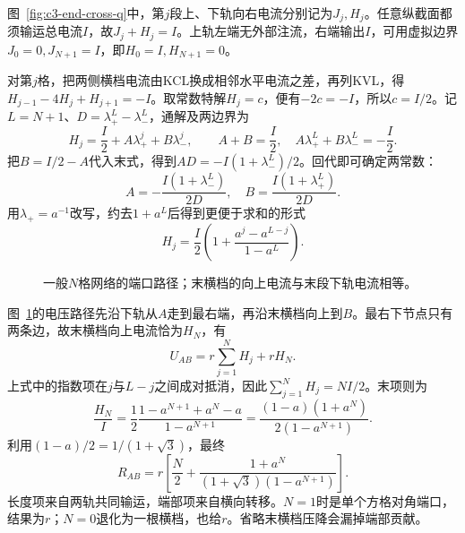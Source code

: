 \begin{solution}
图~\ref{fig:c3-end-cross-q}中，第$j$段上、下轨向右电流分别记为$J_j,H_j$。任意纵截面都须输运总电流$I$，故$J_j+H_j=I$。上轨左端无外部注流，右端输出$I$，可用虚拟边界$J_0=0,J_{N+1}=I$，即$H_0=I,H_{N+1}=0$。

对第$j$格，把两侧横档电流由KCL换成相邻水平电流之差，再列KVL，得$H_{j-1}-4H_j+H_{j+1}=-I$。取常数特解$H_j=c$，便有$-2c=-I$，所以$c=I/2$。记$L=N+1$、$D=\lambda_+^L-\lambda_-^L$，通解及两边界为
\[
 H_j=\frac I2+A\lambda_+^j+B\lambda_-^j,\qquad
 A+B=\frac I2,\quad A\lambda_+^L+B\lambda_-^L=-\frac I2.
\]
把$B=I/2-A$代入末式，得到$AD=-I(1+\lambda_-^L)/2$。回代即可确定两常数：
\[
 A=-\frac{I(1+\lambda_-^L)}{2D},\quad
 B=\frac{I(1+\lambda_+^L)}{2D}.
\]
用$\lambda_+=a^{-1}$改写，约去$1+a^L$后得到更便于求和的形式
\[
 \boxed{H_j=\frac I2\left(1+\frac{a^j-a^{L-j}}{1-a^L}\right)}.
\]
\begin{figure}[H]\centering
{}
\caption{一般$N$格网络的端口路径；末横档的向上电流与末段下轨电流相等。}\label{fig:c3-end-cross-s}
\end{figure}
图~\ref{fig:c3-end-cross-s}的电压路径先沿下轨从$A$走到最右端，再沿末横档向上到$B$。最右下节点只有两条边，故末横档向上电流恰为$H_N$，有
\[
 U_{AB}=r\sum_{j=1}^NH_j+rH_N.
\]
上式中的指数项在$j$与$L-j$之间成对抵消，因此$\sum_{j=1}^NH_j=NI/2$。末项则为
\[
 \frac{H_N}I=\frac12\frac{1-a^{N+1}+a^N-a}{1-a^{N+1}}
 =\frac{(1-a)(1+a^N)}{2(1-a^{N+1})}.
\]
利用$(1-a)/2=1/(1+\sqrt3)$，最终
\[
 \boxed{R_{AB}=r\left[\frac N2+
 \frac{1+a^N}{(1+\sqrt3)(1-a^{N+1})}\right]}.
\]
长度项来自两轨共同输运，端部项来自横向转移。$N=1$时是单个方格对角端口，结果为$r$；$N=0$退化为一根横档，也给$r$。省略末横档压降会漏掉端部贡献。
\end{solution}



